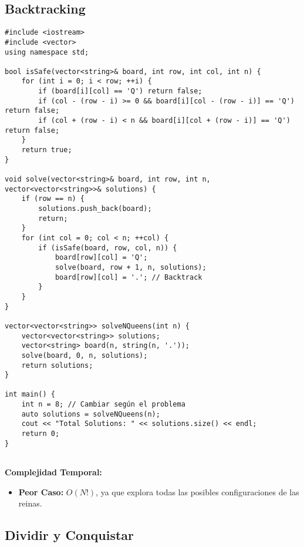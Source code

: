     \subsection{Backtracking}
        \begin{lstlisting}[style=cpp]
#include <iostream>
#include <vector>
using namespace std;

bool isSafe(vector<string>& board, int row, int col, int n) {
    for (int i = 0; i < row; ++i) {
        if (board[i][col] == 'Q') return false;
        if (col - (row - i) >= 0 && board[i][col - (row - i)] == 'Q') return false;
        if (col + (row - i) < n && board[i][col + (row - i)] == 'Q') return false;
    }
    return true;
}

void solve(vector<string>& board, int row, int n, vector<vector<string>>& solutions) {
    if (row == n) {
        solutions.push_back(board);
        return;
    }
    for (int col = 0; col < n; ++col) {
        if (isSafe(board, row, col, n)) {
            board[row][col] = 'Q';
            solve(board, row + 1, n, solutions);
            board[row][col] = '.'; // Backtrack
        }
    }
}

vector<vector<string>> solveNQueens(int n) {
    vector<vector<string>> solutions;
    vector<string> board(n, string(n, '.'));
    solve(board, 0, n, solutions);
    return solutions;
}

int main() {
    int n = 8; // Cambiar según el problema
    auto solutions = solveNQueens(n);
    cout << "Total Solutions: " << solutions.size() << endl;
    return 0;
}


    \end{lstlisting}
    \textbf{Complejidad Temporal: }
    \begin{itemize}
        \item \textbf{Peor Caso: }$O(N!)$, ya que explora todas las posibles configuraciones de las reinas.

    \end{itemize}

\newpage
    \subsection{Dividir y Conquistar}

